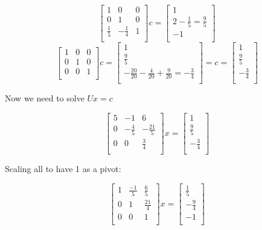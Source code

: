\documentclass{article}
\begin{document}
$$ \begin{bmatrix}
    1 & 0 & 0 \\
    0 & 1 & 0 \\
    \frac{1}{5} & -\frac{1}{4} & 1 \\
\end{bmatrix}c = \begin{bmatrix}
    1  \\
    2  - \frac{1}{5} = \frac{9}{5} \\
    -1  \\
\end{bmatrix}$$
$$ \begin{bmatrix}
    1 & 0 & 0 \\
    0 & 1 & 0 \\
    0 & 0 & 1 \\
\end{bmatrix}c = \begin{bmatrix}
    1  \\
    \frac{9}{5} \\
    -\frac{20}{20} -\frac{4}{20} + \frac{9}{20} = -\frac{3}{4}\\
\end{bmatrix} = c = \begin{bmatrix}
    1  \\
    \frac{9}{5} \\
    -\frac{3}{4}\\
\end{bmatrix}$$

Now we need to solve $Ux = c$

$$\begin{bmatrix}
    5  & -1 & 6 \\
      0 & -\frac{4}{5} & -\frac{21}{5} \\
      0  & 0 & \frac{3}{4} \\
  \end{bmatrix}x = \begin{bmatrix}
    1  \\
    \frac{9}{5} \\
    -\frac{3}{4}\\
\end{bmatrix}$$

Scaling all to have 1 as a pivot:

$$\begin{bmatrix}
  1  & \frac{-1}{5} & \frac{6}{5} \\
    0 & 1 & \frac{21}{4} \\
    0  & 0 & 1 \\
\end{bmatrix}x = \begin{bmatrix}
  \frac{1}{5}  \\
  -\frac{9}{4} \\
  -1\\
\end{bmatrix}$$
\end{document}
